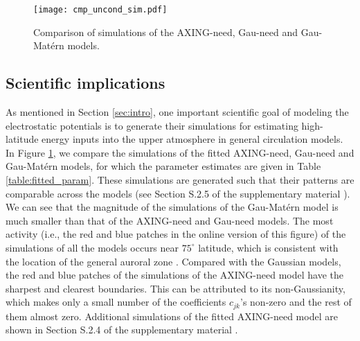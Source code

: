 \documentclass[aoas,preprint]{imsart}
\numberwithin{equation}{section}
\theoremstyle{plain}
\begin{document}
\begin{figure}[htbp] %
   \centering
   \texttt{[image: cmp\_uncond\_sim.pdf]} 
   \caption{Comparison of simulations of the AXING-need, Gau-need and Gau-Mat\'ern models.}
   \label{fig:sim_small_scale}
\end{figure}

\subsection{Scientific implications}\label{sec:sci_imp}
As mentioned in Section \ref{sec:intro}, one important scientific goal of modeling the electrostatic potentials is to generate their simulations for estimating high-latitude energy inputs into the upper atmosphere in general circulation models. In Figure \ref{fig:sim_small_scale}, we  compare the simulations of the fitted AXING-need, Gau-need and Gau-Mat\'ern models, for which the parameter estimates are given in Table \ref{table:fitted_param}. These simulations are generated such that their patterns are comparable across the models (see Section S.2.5 of the supplementary material \citet{Fan-17-supp}). We can see that the magnitude of the simulations of the Gau-Mat\'ern model is much smaller than that of the AXING-need and Gau-need models. %
The most activity (i.e., the red and blue patches in the online version of this figure) of the simulations of all the models occurs near $75^\circ$ latitude, which is consistent with the location of the general auroral zone \citep[Chapter 6.2.1]{Hunsucker-07}. Compared with the Gaussian models, the red and blue patches of the simulations of the AXING-need model have the sharpest and clearest boundaries. This can be attributed to its non-Gaussianity, which makes only a small number of the coefficients $c_{jk}$'s non-zero and the rest of them almost zero. Additional simulations of the fitted AXING-need model are shown in Section S.2.4 of the supplementary material \citep{Fan-17-supp}.
\end{document}
